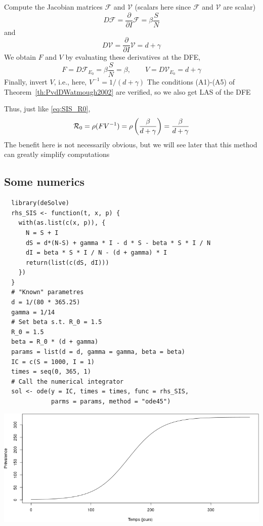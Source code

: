 \documentclass[aspectratio=43]{beamer}
\begin{document}
\begin{frame}
Compute the Jacobian matrices $\mathcal{F}$ and $\mathcal{V}$ (scalars here since $\mathcal{F}$ and $\mathcal{V}$ are scalar)
\[
D\mathcal{F}=\frac{\partial}{\partial I}\mathcal{F}
=\beta\frac SN
\]
and
\[
D\mathcal{V}=\frac{\partial}{\partial I}\mathcal{V}
=d+\gamma
\]
We obtain $F$ and $V$ by evaluating these derivatives at the DFE,
\[
F=D\mathcal{F}_{E_0} = \beta \frac SN=\beta,
\qquad
V=D\mathcal{V}_{E_0} = d+\gamma
\]
Finally, invert $V$, i.e., here, $V^{-1}=1/(d+\gamma)$
The conditions (A1)-(A5) of Theorem~\ref{th:PvdDWatmough2002} are verified, so we also get LAS of the DFE
\end{frame}

\begin{frame}
Thus, just like \eqref{eq:SIS_R0},
$$
\mathcal{R}_0 =\rho(FV^{-1})
=\rho\left(\frac{\beta}{d+\gamma}\right)
=\frac{\beta}{d+\gamma}
$$
\vfill
The benefit here is not necessarily obvious, but we will see later that this method can greatly simplify computations
\end{frame}

\subsection{Some numerics}


\begin{frame}[fragile]
\begin{lstlisting}
  library(deSolve)
  rhs_SIS <- function(t, x, p) {
    with(as.list(c(x, p)), {
      N = S + I
      dS = d*(N-S) + gamma * I - d * S - beta * S * I / N
      dI = beta * S * I / N - (d + gamma) * I
      return(list(c(dS, dI)))
    })
  }
  # "Known" parametres
  d = 1/(80 * 365.25)
  gamma = 1/14
  # Set beta s.t. R_0 = 1.5
  R_0 = 1.5
  beta = R_0 * (d + gamma)
  params = list(d = d, gamma = gamma, beta = beta)
  IC = c(S = 1000, I = 1)
  times = seq(0, 365, 1)
  # Call the numerical integrator
  sol <- ode(y = IC, times = times, func = rhs_SIS, 
             parms = params, method = "ode45")
  \end{lstlisting}
\end{frame}

\begin{frame}{}
  \begin{center}
    \includegraphics[width=\textwidth]{../FIGS/sol_endemic_SIS_R015.png}
  \end{center}
\end{frame}
\end{document}
